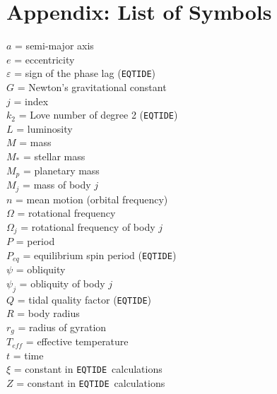 \documentclass[preprint,12pt]{aastex}
\def\eqtide{\texttt{EQTIDE}}
\begin{document}
\section{Appendix: List of Symbols} %
\begin{multicols}{2}
%
\noindent $a$ = semi-major axis\\
%
$e$ = eccentricity\\
$\varepsilon$ = sign of the phase lag (\eqtide)\\
%
$G$ = Newton's gravitational constant\\
%
$j$ = index\\
%
$k_2$ = Love number of degree 2 (\eqtide)\\
%
$L$ = luminosity\\
%
$M$ = mass\\
$M_*$ = stellar mass\\
$M_p$ = planetary mass\\
$M_j$ = mass of body $j$\\
%
$n$ = mean motion (orbital frequency)\\
%
$\Omega$ = rotational frequency\\
$\Omega_j$ = rotational frequency of body $j$\\
%
$P$ = period\\
$P_{eq}$ = equilibrium spin period (\eqtide)\\
$\psi$ = obliquity\\
$\psi_j$ = obliquity of body $j$\\
%
$Q$ = tidal quality factor (\eqtide)\\
%
$R$ = body radius\\
$r_g$ = radius of gyration\\
%
$T_{eff}$ = effective temperature\\
$t$ = time\\
%
$\xi$ = constant in \eqtide~calculations\\ 
%
$Z$ = constant in \eqtide~calculations\\
\end{multicols}


\end{document}
